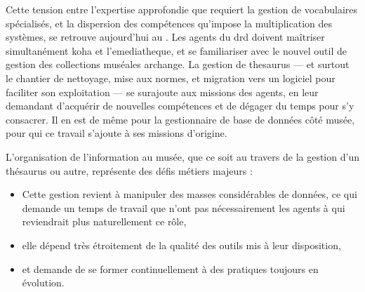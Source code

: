 Cette tension entre l’expertise approfondie que requiert la gestion de vocabulaires spécialisés, et la dispersion des compétences qu’impose la multiplication des systèmes, se retrouve aujourd’hui au \mae. Les agents du \ac{drd} doivent maîtriser simultanément \gls{koha} et l’\gls{emediatheque}, et se familiariser avec le nouvel outil de gestion des collections muséales \gls{archange}. La gestion de \gls{thesaurus} — et surtout le chantier de nettoyage, mise aux normes, et migration vers un logiciel pour faciliter son exploitation — se surajoute aux missions des agents, en leur demandant d’acquérir de nouvelles compétences et de dégager du temps pour s’y consacrer. Il en est de même pour la gestionnaire de base de données côté musée, pour qui ce travail s’ajoute à ses missions d’origine.

L’organisation de l’information au musée, que ce soit au travers de la gestion d’un thésaurus ou autre, représente des défis métiers majeurs :
\begin{itemize}
	\item Cette gestion revient à manipuler des masses considérables de données, ce qui demande un temps de travail que n’ont pas nécessairement les agents à qui reviendrait plus naturellement ce rôle,
	\item elle dépend très étroitement de la qualité des outils mis à leur disposition,
	\item et demande de se former continuellement à des pratiques toujours en évolution.
\end{itemize}